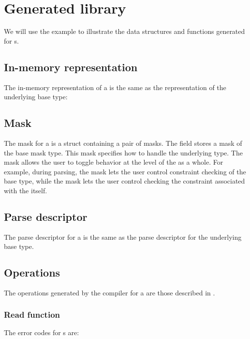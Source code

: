 \section{Generated library}
We will use the  example to illustrate the data structures
and functions generated for \ptypedef{}s.

\subsection{In-memory representation}
\label{sec:typedefs-rep}
The in-memory representation of a \ptypedef{} is the same as the
representation of the underlying base type:



\subsection{Mask}
\label{sec:typedefs-masks}
The mask for a \Ptypedef{} is a \C{} struct containing a pair of masks.  The
 field stores a mask of the base mask type.  This
mask specifies how to handle the underlying type.  The
 mask allows the user to toggle behavior at the level
of the \Ptypedef{} as a whole.  For example, during parsing, the
 mask lets the user control constraint checking of the
base type, while the
 mask lets the user control checking the constraint
associated with the \Ptypedef{} itself.



\subsection{Parse descriptor}
\label{sec:typedefs-parse-descriptors}
The parse descriptor for a \Ptypedef{} is the same as the parse
descriptor for the underlying base type.


\subsection{Operations}
The operations generated by the \pads{} compiler for a \Ptypedef{} are
those described in .


\subsubsection{Read function}
The error codes for \Ptypedef{}s are:

